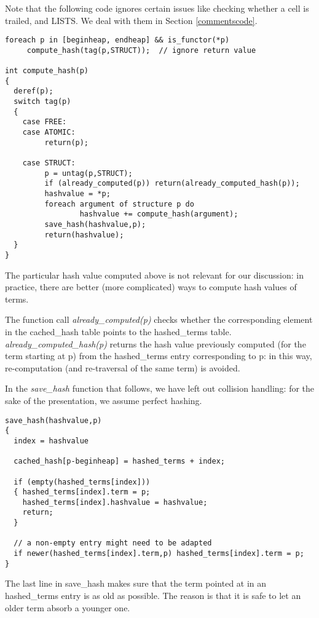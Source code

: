 \documentclass{tlp}
\begin{document}
Note that the following code ignores certain issues like checking
whether a cell is trailed, and LISTS. We deal with them in Section
\ref{commentscode}.

\begin{Verbatim}[fontsize=\small, frame=single,samepage=true]
foreach p in [beginheap, endheap] && is_functor(*p)
     compute_hash(tag(p,STRUCT));  // ignore return value

int compute_hash(p)
{
  deref(p);
  switch tag(p)
  {
    case FREE:
    case ATOMIC:
         return(p);

    case STRUCT:
         p = untag(p,STRUCT);
         if (already_computed(p)) return(already_computed_hash(p));
         hashvalue = *p;
         foreach argument of structure p do
                 hashvalue += compute_hash(argument);
         save_hash(hashvalue,p);
         return(hashvalue);
  }
}
\end{Verbatim}

The particular hash value computed above is not relevant for our
discussion: in practice, there are better (more complicated) ways to
compute hash values of terms.

The function call {\em already\_computed(p)} checks whether the
corresponding element in the cached\_hash table points to the
hashed\_terms table.  {\em already\_computed\_hash(p)} returns the
hash value previously computed (for the term starting at p) from the
hashed\_terms entry corresponding to p: in this way, re-computation
(and re-traversal of the same term) is avoided.

In the {\em save\_hash} function that follows, we have left out
collision handling: for the sake of the presentation, we assume
perfect hashing.

\begin{Verbatim}[fontsize=\small, frame=single,samepage=true]
save_hash(hashvalue,p)
{
  index = hashvalue 

  cached_hash[p-beginheap] = hashed_terms + index;

  if (empty(hashed_terms[index]))
  { hashed_terms[index].term = p;
    hashed_terms[index].hashvalue = hashvalue;
    return;
  }

  // a non-empty entry might need to be adapted
  if newer(hashed_terms[index].term,p) hashed_terms[index].term = p;
}
\end{Verbatim}

The last line in save\_hash makes sure that the term pointed at in an
hashed\_terms entry is as old as possible. The reason is that it is
safe to let an older term absorb a younger one.
\end{document}
